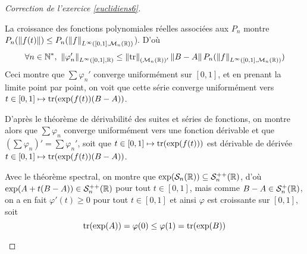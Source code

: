 \begin{proof}[Correction de l'exercice \ref{euclidiens6}]
\begin{enumerate}
		La croissance des fonctions polynomiales réelles associées aux $P_n$ montre $P_n({\left\lVert f(t)\right\rVert})\leq P_n(\left\lVert f\right\rVert_{L^{\infty}([0,1],\mathcal M_n(\operatorname{\mathbb R}))}$).
		D'où 
		\[
			\forall n\in\N^*,\ \norm{\varphi'_n}_{L^\infty([0,1],\R)}\leq \norm{\tr}_{(\mathcal M_n(\R))'}\norm{B-A}P_n(\norm{f}_{L^{\infty}([0,1],\mathcal M_n(\R))})
		\]
		Ceci montre que $\sum\varphi_n'$ converge uniformément sur $[0,1]$, et en prenant la limite point par point,
		on voit que cette série converge uniformément vers $t\in[0,1]\mapsto\operatorname{tr}(\exp(f(t))(B-A))$.

		D'après le théorème de dérivabilité des suites et séries de fonctions, on montre alors que $\sum\varphi_n$ converge uniformément vers une fonction dérivable 
		et que $(\sum\varphi_n)'=\sum\varphi_n'$, soit que $t\in[0,1]\mapsto\operatorname{tr}(\exp(f(t)))$ est dérivable de dérivée $t\in[0,1]\mapsto \operatorname{tr}(\exp(f(t))(B-A))$.

		Avec le théorème spectral, on montre que $\exp(\mathcal S_n(\operatorname{\mathbb R}))\subseteq \mathcal S_n^{++}(\operatorname{\mathbb R})$, d'où $\exp(A+t(B-A))\in\mathcal S_n^{++}(\operatorname{\mathbb R})$ pour tout $t\in[0,1]$,
		mais comme $B-A\in\mathcal S_n^+(\operatorname{\mathbb R})$, on a en fait $\varphi'(t)\geq 0$ pour tout $t\in[0,1]$ et ainsi $\varphi$ est croissante sur $[0,1]$, soit 
		\[
			\operatorname{tr}(\exp(A))=\varphi(0)\leq\varphi(1)=\operatorname{tr}(\exp(B))	
		\]
	\end{enumerate}
\end{proof}